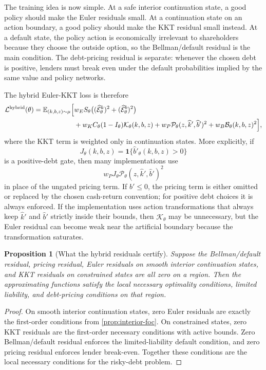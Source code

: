 \documentclass[11pt]{article}
\newtheorem{proposition}{Proposition}
\newcommand{\E}{\mathbb{E}}
\newcommand{\1}{\mathbf{1}}
\begin{document}
The training idea is now simple. At a safe interior continuation state, a good
policy should make the Euler residuals small. At a continuation state on an
action boundary, a good policy should make the KKT residual small instead. At a
default state, the policy action is economically irrelevant to shareholders
because they choose the outside option, so the Bellman/default residual is the
main condition. The debt-pricing residual is separate: whenever the chosen debt
is positive, lenders must break even under the default probabilities implied by
the same value and policy networks.

The hybrid Euler-KKT loss is therefore
\begin{align}
  \mathcal L^{\mathrm{hybrid}}(\theta)
  =
  \E_{(k,b,z)\sim\mu}
  \Big[
    &w_E S_\theta
      \big((\widehat{\mathcal E}^k_\theta)^2
      +(\widehat{\mathcal E}^b_\theta)^2\big) \notag\\
    &+w_K C_\theta(1-I_\theta)\mathcal K_\theta(k,b,z)
      +w_P\mathcal P_\theta(z,\widehat k',\widehat b')^2
      +w_B\mathcal B_\theta(k,b,z)^2
  \Big],
  \label{eq:hybrid-euler-kkt-objective}
\end{align}
where the KKT term is weighted only in continuation states. More explicitly, if
\[
  J_\theta(k,b,z)=\1\{\widehat b'_\theta(k,b,z)>0\}
\]
is a positive-debt gate, then many implementations use
\[
  w_PJ_\theta\mathcal P_\theta(z,\widehat k',\widehat b')^2
\]
in place of the ungated pricing term. If \(b'\le0\), the pricing term is either
omitted or replaced by the chosen cash-return convention; for positive debt
choices it is always enforced.
If the implementation uses action transformations that always keep
\(\widehat k'\) and \(\widehat b'\) strictly inside their bounds, then
\(\mathcal K_\theta\) may be unnecessary, but the Euler residual can become weak
near the artificial boundary because the transformation saturates.

\begin{proposition}[What the hybrid residuals certify]
\label{prop:hybrid-residuals}
Suppose the Bellman/default residual, pricing residual, Euler residuals on
smooth interior continuation states, and KKT residuals on constrained states are
all zero on a region. Then the approximating functions satisfy the local
necessary optimality conditions, limited liability, and debt-pricing conditions
on that region.
\end{proposition}

\begin{proof}
On smooth interior continuation states, zero Euler residuals are exactly the
first-order conditions from \cref{prop:interior-foc}. On constrained states,
zero KKT residuals are the first-order necessary conditions with active bounds.
Zero Bellman/default residual enforces the limited-liability default condition,
and zero pricing residual enforces lender break-even. Together these conditions
are the local necessary conditions for the risky-debt problem.
\end{proof}
\end{document}
